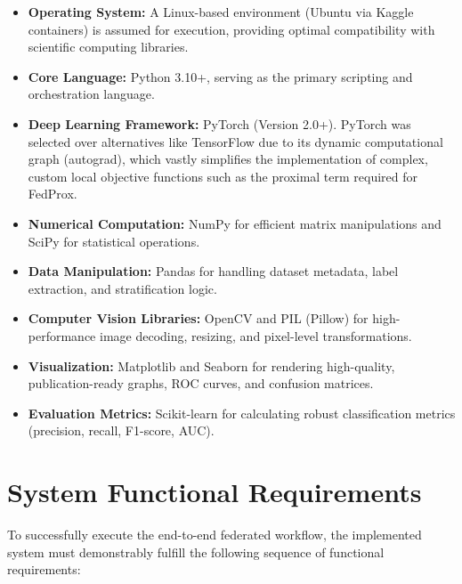 \documentclass[12pt,a4paper]{report}
\begin{document}
\begin{itemize}
    \item \textbf{Operating System:} A Linux-based environment (Ubuntu via Kaggle containers) is assumed for execution, providing optimal compatibility with scientific computing libraries.
    \item \textbf{Core Language:} Python 3.10+, serving as the primary scripting and orchestration language.
    \item \textbf{Deep Learning Framework:} PyTorch (Version 2.0+). PyTorch was selected over alternatives like TensorFlow due to its dynamic computational graph (autograd), which vastly simplifies the implementation of complex, custom local objective functions such as the proximal term required for FedProx.
    \item \textbf{Numerical Computation:} NumPy for efficient matrix manipulations and SciPy for statistical operations.
    \item \textbf{Data Manipulation:} Pandas for handling dataset metadata, label extraction, and stratification logic.
    \item \textbf{Computer Vision Libraries:} OpenCV and PIL (Pillow) for high-performance image decoding, resizing, and pixel-level transformations.
    \item \textbf{Visualization:} Matplotlib and Seaborn for rendering high-quality, publication-ready graphs, ROC curves, and confusion matrices.
    \item \textbf{Evaluation Metrics:} Scikit-learn for calculating robust classification metrics (precision, recall, F1-score, AUC).
\end{itemize}

\section{System Functional Requirements}

To successfully execute the end-to-end federated workflow, the implemented system must demonstrably fulfill the following sequence of functional requirements:
\end{document}

